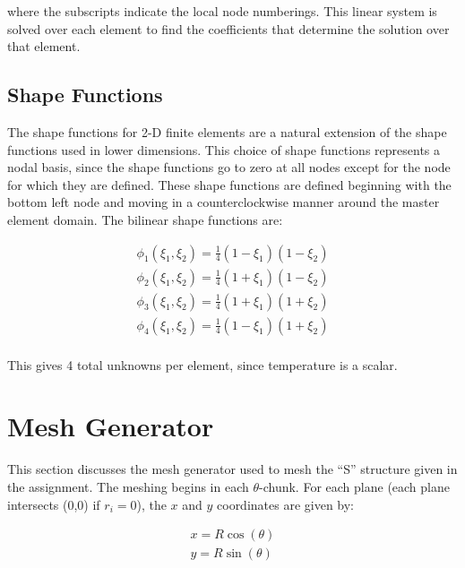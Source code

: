 \documentclass[10pt]{article}
\begin{document}
where the subscripts indicate the local node numberings. This linear system is solved over each element to find the coefficients that determine the solution over that element.

\subsection{Shape Functions}

The shape functions for 2-D finite elements are a natural extension of the shape functions used in lower dimensions. This choice of shape functions represents a nodal basis, since the shape functions go to zero at all nodes except for the node for which they are defined. These shape functions are defined beginning with the bottom left node and moving in a counterclockwise manner around the master element domain. The bilinear shape functions are:

\begin{equation}
\label{eq:Bricks}
\begin{aligned}
\phi_1(\xi_1,\xi_2)=\frac{1}{4}(1-\xi_1)(1-\xi_2)\\
\phi_2(\xi_1,\xi_2)=\frac{1}{4}(1+\xi_1)(1-\xi_2)\\
\phi_3(\xi_1,\xi_2)=\frac{1}{4}(1+\xi_1)(1+\xi_2)\\
\phi_4(\xi_1,\xi_2)=\frac{1}{4}(1-\xi_1)(1+\xi_2)\\
\end{aligned}
\end{equation}

This gives 4 total unknowns per element, since temperature is a scalar.

\section{Mesh Generator}

This section discusses the mesh generator used to mesh the ``S'' structure given in the assignment. The meshing begins in each \(\theta\)-chunk. For each plane (each plane intersects (0,0) if \(r_i=0\)), the \(x\) and \(y\) coordinates are given by:

\begin{equation}
\begin{aligned}
x=R\cos{(\theta)}\\
y=R\sin{(\theta)}\\
\end{aligned}
\end{equation}
\end{document}
